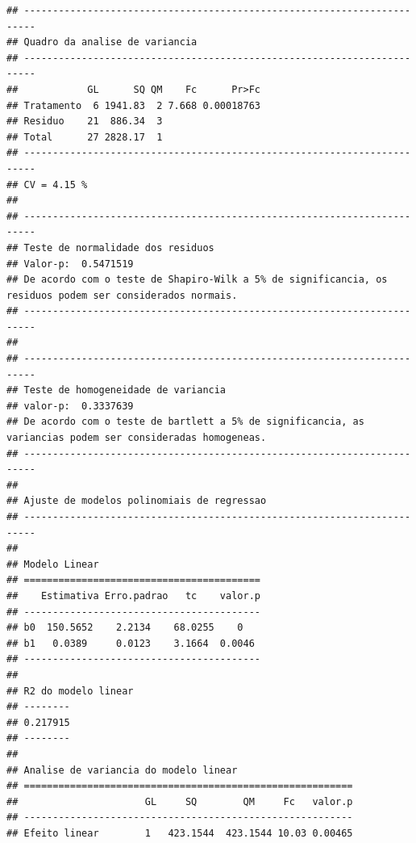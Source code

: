 \documentclass[
]{book}
\newenvironment{Shaded}{\begin{snugshade}}{\end{snugshade}}
\newcommand{\CommentTok}[1]{\textcolor[rgb]{0.56,0.35,0.01}{\textit{#1}}}
\newcommand{\DataTypeTok}[1]{\textcolor[rgb]{0.13,0.29,0.53}{#1}}
\newcommand{\KeywordTok}[1]{\textcolor[rgb]{0.13,0.29,0.53}{\textbf{#1}}}
\newcommand{\NormalTok}[1]{#1}
\newcommand{\OperatorTok}[1]{\textcolor[rgb]{0.81,0.36,0.00}{\textbf{#1}}}
\newcommand{\OtherTok}[1]{\textcolor[rgb]{0.56,0.35,0.01}{#1}}
\newcommand{\StringTok}[1]{\textcolor[rgb]{0.31,0.60,0.02}{#1}}
\begin{document}
\begin{Shaded}
\end{Shaded}

\begin{verbatim}
## ------------------------------------------------------------------------
## Quadro da analise de variancia
## ------------------------------------------------------------------------
##            GL      SQ QM    Fc      Pr>Fc
## Tratamento  6 1941.83  2 7.668 0.00018763
## Residuo    21  886.34  3                 
## Total      27 2828.17  1                 
## ------------------------------------------------------------------------
## CV = 4.15 %
## 
## ------------------------------------------------------------------------
## Teste de normalidade dos residuos 
## Valor-p:  0.5471519 
## De acordo com o teste de Shapiro-Wilk a 5% de significancia, os residuos podem ser considerados normais.
## ------------------------------------------------------------------------
## 
## ------------------------------------------------------------------------
## Teste de homogeneidade de variancia 
## valor-p:  0.3337639 
## De acordo com o teste de bartlett a 5% de significancia, as variancias podem ser consideradas homogeneas.
## ------------------------------------------------------------------------
## 
## Ajuste de modelos polinomiais de regressao
## ------------------------------------------------------------------------
## 
## Modelo Linear
## =========================================
##    Estimativa Erro.padrao   tc    valor.p
## -----------------------------------------
## b0  150.5652    2.2134    68.0255    0   
## b1   0.0389     0.0123    3.1664  0.0046 
## -----------------------------------------
## 
## R2 do modelo linear
## --------
## 0.217915
## --------
## 
## Analise de variancia do modelo linear
## =========================================================
##                      GL     SQ        QM     Fc   valor.p
## ---------------------------------------------------------
## Efeito linear        1   423.1544  423.1544 10.03 0.00465

\end{verbatim}
\end{document}
